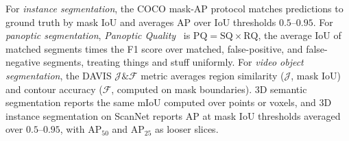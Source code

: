 For \emph{instance segmentation}, the COCO mask-AP protocol matches predictions to ground truth by mask IoU and averages AP over IoU thresholds $0.5$--$0.95$.
For \emph{panoptic segmentation}, \emph{Panoptic Quality}~\cite{kirillov2019panoptic} is $\mathrm{PQ} = \mathrm{SQ} \times \mathrm{RQ}$, the average IoU of matched segments times the F1 score over matched, false-positive, and false-negative segments, treating things and stuff uniformly.
For \emph{video object segmentation}, the DAVIS $\mathcal{J}\&\mathcal{F}$ metric averages region similarity ($\mathcal{J}$, mask IoU) and contour accuracy ($\mathcal{F}$, computed on mask boundaries).
3D semantic segmentation reports the same mIoU computed over points or voxels, and 3D instance segmentation on ScanNet reports AP at mask IoU thresholds averaged over $0.5$--$0.95$, with AP$_{50}$ and AP$_{25}$ as looser slices.


